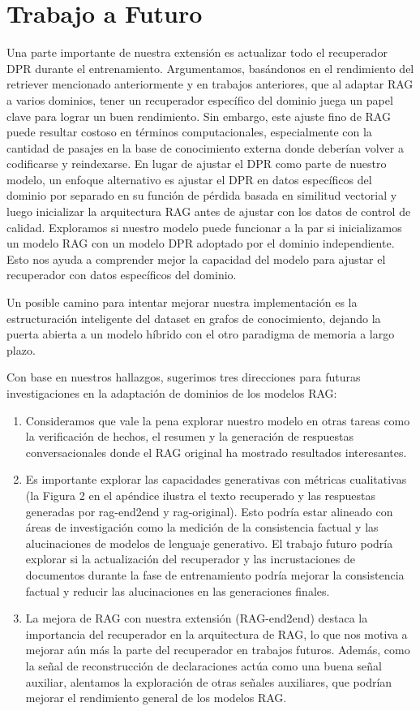 \documentclass{article}
\begin{document}
\section{Trabajo a Futuro}

Una parte importante de nuestra extensión es actualizar todo el recuperador DPR durante el entrenamiento. Argumentamos, basándonos en el rendimiento del retriever mencionado anteriormente y en trabajos anteriores, que al adaptar RAG a varios dominios, tener un recuperador específico del dominio juega un papel clave para lograr un buen rendimiento. Sin embargo, este ajuste fino de RAG puede resultar costoso en términos computacionales, especialmente con la cantidad de pasajes en la base de conocimiento externa donde deberían volver a codificarse y reindexarse. En lugar de ajustar el DPR como parte de nuestro modelo, un enfoque alternativo es ajustar el DPR en datos específicos del dominio por separado en su función de pérdida basada en similitud vectorial y luego inicializar la arquitectura RAG antes de ajustar con los datos de control de calidad. Exploramos si nuestro modelo puede funcionar a la par si inicializamos un modelo RAG con un modelo DPR adoptado por el dominio independiente. Esto nos ayuda a comprender mejor la capacidad del modelo para ajustar el recuperador con datos específicos del dominio.

Un posible camino para intentar mejorar nuestra implementación es la estructuración inteligente del dataset en grafos de conocimiento, dejando la puerta abierta a un modelo híbrido con el otro paradigma de memoria a largo plazo.

Con base en nuestros hallazgos, sugerimos tres direcciones para futuras investigaciones en la adaptación de dominios de los modelos RAG:

\begin{enumerate}
    \item Consideramos que vale la pena explorar nuestro modelo en otras tareas como la verificación de hechos, el resumen y la generación de respuestas conversacionales donde el RAG original ha mostrado resultados interesantes.
    \item Es importante explorar las capacidades generativas con métricas cualitativas (la Figura 2 en el apéndice ilustra el texto recuperado y las respuestas generadas por rag-end2end y rag-original). Esto podría estar alineado con áreas de investigación como la medición de la consistencia factual y las alucinaciones de modelos de lenguaje generativo. El trabajo futuro podría explorar si la actualización del recuperador y las incrustaciones de documentos durante la fase de entrenamiento podría mejorar la consistencia factual y reducir las alucinaciones en las generaciones finales.
    \item La mejora de RAG con nuestra extensión (RAG-end2end) destaca la importancia del recuperador en la arquitectura de RAG, lo que nos motiva a mejorar aún más la parte del recuperador en trabajos futuros. Además, como la señal de reconstrucción de declaraciones actúa como una buena señal auxiliar, alentamos la exploración de otras señales auxiliares, que podrían mejorar el rendimiento general de los modelos RAG.
\end{enumerate}
\end{document}
